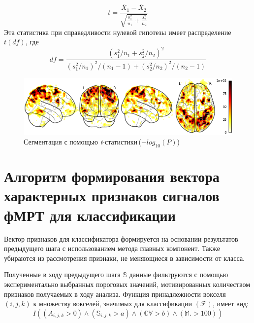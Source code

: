 \begin{equation*}
{\displaystyle t={\frac {{\overline {X}}_{1}-{\overline {X}}_{2}}{\sqrt {{\frac {s_{1}^{2}}{n_{1}}}+{\frac {s_{2}^{2}}{n_{2}}}}}}}
\end{equation*}
Эта статистика при справедливости нулевой гипотезы имеет распределение ${\displaystyle t(df)}$, где \[{\displaystyle df={\frac {(s_{1}^{2}/n_{1}+s_{2}^{2}/n_{2})^{2}}{(s_{1}^{2}/n_{1})^{2}/(n_{1}-1)+(s_{2}^{2}/n_{2})^{2}/(n_{2}-1)}}}\]

\begin{figure}%
	\begin{center}
		\includegraphics[width=.8\columnwidth]{./img/logpval.png}%
	\end{center}
	\caption{Сегментация с помощью \textit{t}-статистики\,($-log_{10}(P)$)}%
	\label{pic:ttest}%
\end{figure}



\section{Алгоритм формирования вектора характерных признаков сигналов фМРТ для классификации}
\begin{annotation}
Вектор признаков для классификатора формируется на основании результатов предыдущего шага с использованием метода главных компонент. Также убираются из рассмотрения признаки, не меняющиеся в зависимости от класса.
\end{annotation}

Полученные в ходу предыдущего шага $\mathbb{S}$ данные фильтруются с помощью экспериментально выбранных пороговых значений, мотивированных количеством признаков получаемых в ходу анализа. 
Функция принадлежности вокселя $(i,j,k)$ к множеству вокселей, значимых для классификации $(\mathcal{F})$, имеет вид:
\[
I((A_{i,j,k} > 0) \wedge (\mathbb{S}_{i,j,k} >  a) \wedge (\mathbb{CV} > b ) \wedge (\mathbb{M} .> 100))
\]

